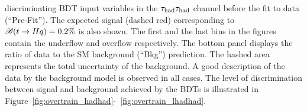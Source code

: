 discriminating BDT input variables in the $\tau_{\mathrm{had}} \tau_{\mathrm{had}}$ channel before the fit to data (``Pre-Fit'').
The expected signal (dashed red) corresponding to $\mathscr{B}(t\to Hq)=0.2\%$ is also shown.
The first and the last bins in the figures contain the underflow and overflow respectively.
The bottom panel displays the ratio of data to the SM background (``Bkg'') prediction.
The hashed area represents the total uncertainty of the background.
A good description of the data by the background model is observed in all cases.
The level of discrimination between signal and background achieved by the BDTs is illustrated in Figure~\ref{fig:overtrain_hadhad}-~\ref{fig:overtrain_lhadhad}.




